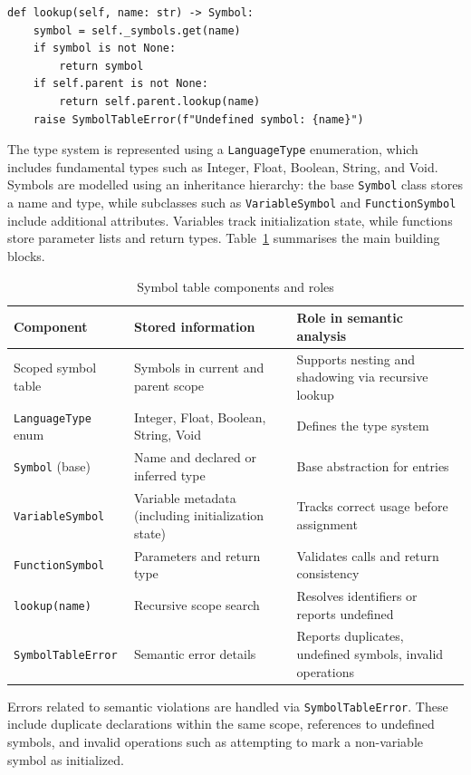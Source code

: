 \begin{lstlisting}
def lookup(self, name: str) -> Symbol:
    symbol = self._symbols.get(name)
    if symbol is not None:
        return symbol
    if self.parent is not None:
        return self.parent.lookup(name)
    raise SymbolTableError(f"Undefined symbol: {name}")
\end{lstlisting}

The type system is represented using a \texttt{LanguageType} enumeration, which
includes fundamental types such as Integer, Float, Boolean, String, and Void.
Symbols are modelled using an inheritance hierarchy: the base \texttt{Symbol}
class stores a name and type, while subclasses such as
\texttt{VariableSymbol} and \texttt{FunctionSymbol} include additional
attributes. Variables track initialization state, while functions store
parameter lists and return types. Table~\ref{tab:symbol-table-components}
summarises the main building blocks.

\begin{table}[H]
\centering
\caption{Symbol table components and roles}
\label{tab:symbol-table-components}
\small
\begin{tabular}{p{}p{}p{}}
\toprule
Component & Stored information & Role in semantic analysis \\
\midrule
Scoped symbol table & Symbols in current and parent scope & Supports nesting
and shadowing via recursive lookup \\
\texttt{LanguageType} enum & Integer, Float, Boolean, String, Void & Defines
the type system \\
\texttt{Symbol} (base) & Name and declared or inferred type & Base abstraction
for entries \\
\texttt{VariableSymbol} & Variable metadata (including initialization state) &
Tracks correct usage before assignment \\
\texttt{FunctionSymbol} & Parameters and return type & Validates calls and
return consistency \\
\texttt{lookup(name)} & Recursive scope search & Resolves identifiers or
reports undefined \\
\texttt{SymbolTableError} & Semantic error details & Reports duplicates,
undefined symbols, invalid operations \\
\bottomrule
\end{tabular}
\end{table}

Errors related to semantic violations are handled via
\texttt{SymbolTableError}. These include duplicate declarations within the same
scope, references to undefined symbols, and invalid operations such as
attempting to mark a non-variable symbol as initialized.


